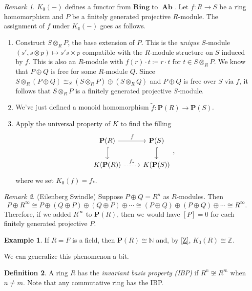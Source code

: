 \documentclass[10pt,letterpaper,cm]{nupset}
\theoremstyle{definition}
\newtheorem{definition}{Definition}
\newtheorem{exmp}[definition]{Example}
\theoremstyle{theorem}
\theoremstyle{remark}
\newtheorem{remark}{Remark}
\newcommand{\N}{\mathbb N}
\renewcommand{\P}{\mathbf P}
\newcommand{\Z}{\mathbb Z}
\newcommand{\1}{\mathbf{1}}
\newcommand{\0}{\vec 0}
\DeclareMathOperator{\Ab}{\mathbf{Ab}}
\begin{document}
\begin{remark}
$K_0(-)$ defines a functor from $\mathbf{Ring}$ to $\Ab$. Let $f: R \to S$ be a ring homomorphism and $P$ be a finitely generated projective $R$-module. The assignment of $f$ under $K_0(-)$ goes as follows.
\begin{enumerate}
\item Construct $S\otimes_R P$, the base extension of $P$. This is the \textit{unique} $S$-module $(s', s \otimes p) \mapsto  s's \times p$ compatible with the $R$-module structure on $S$ induced by $f$. This is also an $R$-module with $f(r) \cdot t \coloneqq r\cdot t$ for $t\in S \otimes_R P$. We know that $P \oplus Q$ is free for some $R$-module $Q$. Since $S\otimes_R (P \oplus Q) \cong_S (S \otimes_R P)\oplus (S \otimes_R Q)$ and $P\oplus Q$ is free over $S$ via $f$, it follows that  $S \otimes_R P$ is a finitely generated projective $S$-module.
\item We've just defined a monoid homomorphism $\tilde{f} : \P(R) \to \P(S)$.
\item Apply the universal property of $K$ to find the filling 
\[
\begin{tikzcd}
\mathbf{P}(R) \arrow[d, hook] \arrow[r, "\tilde{f}"] & \mathbf{P}(S) \arrow[d, hook] \\
K(\mathbf{P}(R)) \arrow[r, "f_{\ast}", dotted] & K(\mathbf{P}(S))
\end{tikzcd},
\]
where we set $K_0(f) = f_{\ast}$.
\end{enumerate}
\end{remark}

\begin{remark}{(Eilenberg Swindle)}
Suppose $P \oplus Q =R^n$ as $R$-modules. Then $$P \oplus R^{\infty} \cong P \oplus  (Q \oplus P) \oplus (Q \oplus P) \oplus \cdots \cong (P \oplus Q) \oplus (P \oplus Q) \oplus \cdots \cong R^{\infty}.$$
Therefore, if we added $R^{\infty}$ to $\P(R)$, then we would have $[P] = 0$ for each finitely generated projective $P$.
\end{remark}

\begin{exmp}
If $R =F$ is a field, then $\P(R) \cong \N$ and, by \cref{Z}, $K_0(R) \cong \Z$. 

We can generalize this phenomenon a bit.
\end{exmp}

\begin{definition}
A ring $R$ has the \textit{invariant basis property (IBP)} if $R^n \not \cong R^m$ when $n \ne m$. Note that any commutative ring has the IBP.
\end{definition}
\end{document}
